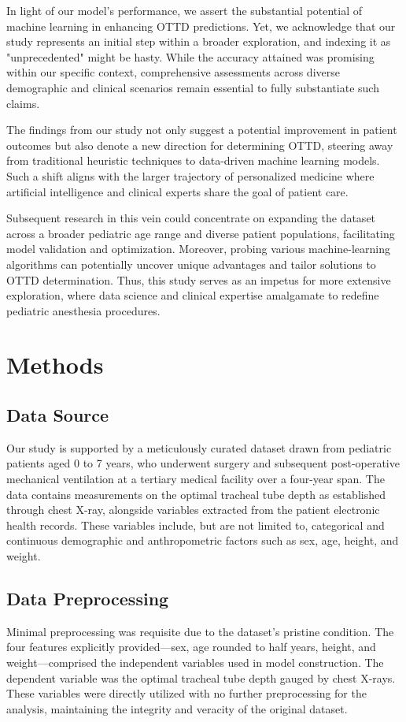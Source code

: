 \documentclass[11pt]{article}
\begin{document}
In light of our model's performance, we assert the substantial potential of machine learning in enhancing OTTD predictions. Yet, we acknowledge that our study represents an initial step within a broader exploration, and indexing it as "unprecedented" might be hasty. While the accuracy attained was promising within our specific context, comprehensive assessments across diverse demographic and clinical scenarios remain essential to fully substantiate such claims.

The findings from our study not only suggest a potential improvement in patient outcomes but also denote a new direction for determining OTTD, steering away from traditional heuristic techniques to data-driven machine learning models. Such a shift aligns with the larger trajectory of personalized medicine where artificial intelligence and clinical experts share the goal of patient care.

Subsequent research in this vein could concentrate on expanding the dataset across a broader pediatric age range and diverse patient populations, facilitating model validation and optimization. Moreover, probing various machine-learning algorithms can potentially uncover unique advantages and tailor solutions to OTTD determination. Thus, this study serves as an impetus for more extensive exploration, where data science and clinical expertise amalgamate to redefine pediatric anesthesia procedures.

\section*{Methods}

\subsection*{Data Source}
Our study is supported by a meticulously curated dataset drawn from pediatric patients aged 0 to 7 years, who underwent surgery and subsequent post-operative mechanical ventilation at a tertiary medical facility over a four-year span. The data contains measurements on the optimal tracheal tube depth as established through chest X-ray, alongside variables extracted from the patient electronic health records. These variables include, but are not limited to, categorical and continuous demographic and anthropometric factors such as sex, age, height, and weight.

\subsection*{Data Preprocessing}
Minimal preprocessing was requisite due to the dataset's pristine condition. The four features explicitly provided—sex, age rounded to half years, height, and weight—comprised the independent variables used in model construction. The dependent variable was the optimal tracheal tube depth gauged by chest X-rays. These variables were directly utilized with no further preprocessing for the analysis, maintaining the integrity and veracity of the original dataset.
\end{document}
